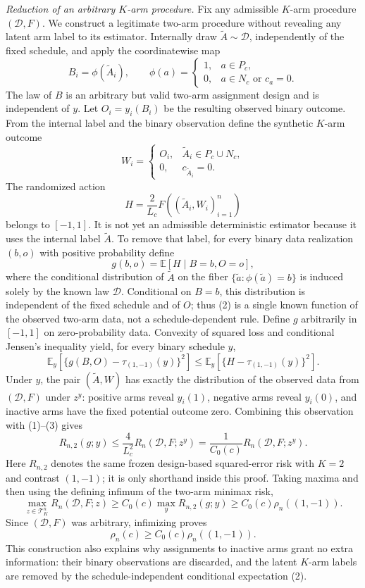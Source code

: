 \textit{Reduction of an arbitrary \(K\)-arm procedure.}
Fix any admissible \(K\)-arm procedure \((\mathcal D,F)\). We construct a legitimate two-arm procedure without revealing any latent arm label to its estimator. Internally draw \(\widetilde A\sim\mathcal D\), independently of the fixed schedule, and apply the coordinatewise map
\[
 B_i=\phi(\widetilde A_i),
 \qquad
 \phi(a)=
 \begin{cases}
 1,&a\in P_c,\\
 0,&a\in N_c\text{ or }c_a=0.
 \end{cases}
\]
The law of \(B\) is an arbitrary but valid two-arm assignment design and is independent of \(y\). Let \(O_i=y_i(B_i)\) be the resulting observed binary outcome. From the internal label and the binary observation define the synthetic \(K\)-arm outcome
\[
 W_i=
 \begin{cases}
 O_i,&\widetilde A_i\in P_c\cup N_c,\\
 0,&c_{\widetilde A_i}=0.
 \end{cases}
\]
The randomized action
\[
 H=\frac{2}{L_c}F((\widetilde A_i,W_i)_{i=1}^n)
\]
belongs to \([-1,1]\). It is not yet an admissible deterministic estimator because it uses the internal label \(\widetilde A\). To remove that label, for every binary data realization \((b,o)\) with positive probability define
\[
 g(b,o)=\mathbb E\!\left[H\mid B=b,O=o\right],
 \tag{2}
\]
where the conditional distribution of \(\widetilde A\) on the fiber \(\{\widetilde a:\phi(\widetilde a)=b\}\) is induced solely by the known law \(\mathcal D\). Conditional on \(B=b\), this distribution is independent of the fixed schedule and of \(O\); thus (2) is a single known function of the observed two-arm data, not a schedule-dependent rule. Define \(g\) arbitrarily in \([-1,1]\) on zero-probability data. Convexity of squared loss and conditional Jensen's inequality yield, for every binary schedule \(y\),
\[
 \mathbb E_y\!\left[\{g(B,O)-\tau_{(1,-1)}(y)\}^2\right]
 \leq
 \mathbb E_y\!\left[\{H-\tau_{(1,-1)}(y)\}^2\right].
 \tag{3}
\]
Under \(y\), the pair \((\widetilde A,W)\) has exactly the distribution of the observed data from \((\mathcal D,F)\) under \(z^y\): positive arms reveal \(y_i(1)\), negative arms reveal \(y_i(0)\), and inactive arms have the fixed potential outcome zero. Combining this observation with (1)--(3) gives
\[
 R_{n,2}(g;y)
 \leq \frac{4}{L_c^2}R_n(\mathcal D,F;z^y)
 =\frac{1}{C_0(c)}R_n(\mathcal D,F;z^y).
 \tag{4}
\]
Here \(R_{n,2}\) denotes the same frozen design-based squared-error risk with \(K=2\) and contrast \((1,-1)\); it is only shorthand inside this proof. Taking maxima and then using the defining infimum of the two-arm minimax risk,
\[
 \max_{z\in\mathcal T_K^n}R_n(\mathcal D,F;z)
 \geq C_0(c)\max_y R_{n,2}(g;y)
 \geq C_0(c)\rho_n((1,-1)).
\]
Since \((\mathcal D,F)\) was arbitrary, infimizing proves
\[
 \rho_n(c)\geq C_0(c)\rho_n((1,-1)).
 \tag{5}
\]
This construction also explains why assignments to inactive arms grant no extra information: their binary observations are discarded, and the latent \(K\)-arm labels are removed by the schedule-independent conditional expectation (2).

